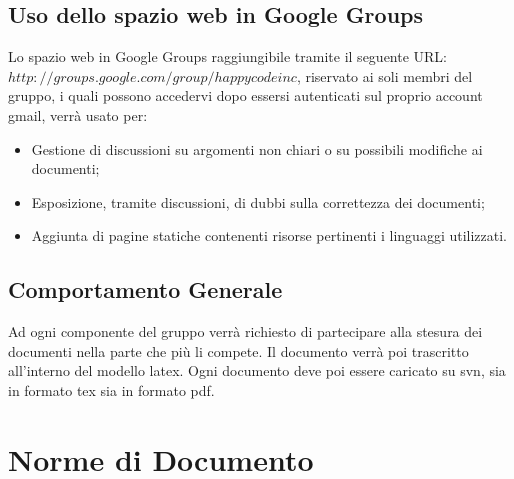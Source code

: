 \documentclass[11pt,titlepage,a4paper]{report}
\begin{document}
\section{Uso dello spazio web in Google Groups}
Lo spazio web in Google Groups raggiungibile tramite il seguente URL: \({http://groups.google.com/group/happycodeinc}\), riservato ai soli membri del gruppo, i quali possono accedervi dopo essersi autenticati sul proprio account gmail, verr\`a usato per:
\begin{itemize}
\item Gestione di discussioni su argomenti non chiari o su possibili modifiche ai documenti;
\item Esposizione, tramite discussioni, di dubbi sulla correttezza dei documenti;
\item Aggiunta di pagine statiche contenenti risorse pertinenti i linguaggi utilizzati.
\end{itemize}
\section{Comportamento Generale}
Ad ogni componente del gruppo verr\`a richiesto di partecipare alla stesura dei documenti nella parte che pi\`u li compete. Il documento verr\`a poi trascritto all'interno del modello latex. Ogni documento deve poi essere caricato  su svn, sia in formato tex sia in formato pdf.

\chapter{Norme di Documento}
\end{document}

